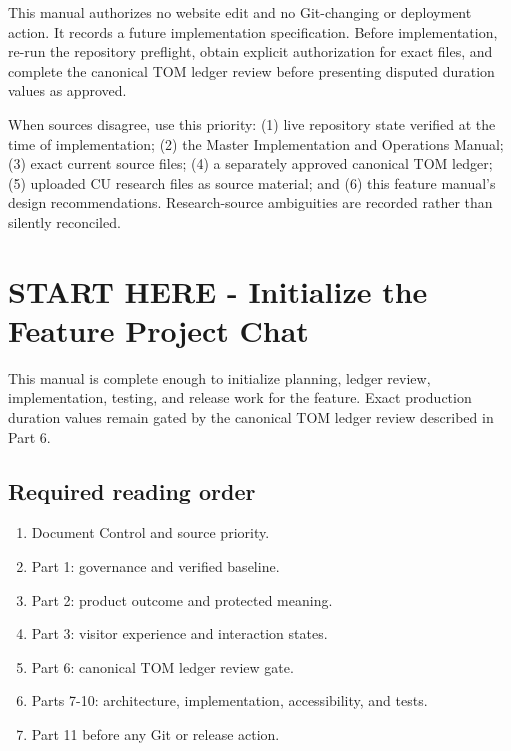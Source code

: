 \documentclass[11pt,letterpaper]{article}
\begin{document}
\begin{safetybox}
This manual authorizes no website edit and no Git-changing or deployment action. It records a future implementation specification. Before implementation, re-run the repository preflight, obtain explicit authorization for exact files, and complete the canonical TOM ledger review before presenting disputed duration values as approved.
\end{safetybox}

\begin{authoritybox}
When sources disagree, use this priority: (1) live repository state verified at the time of implementation; (2) the Master Implementation and Operations Manual; (3) exact current source files; (4) a separately approved canonical TOM ledger; (5) uploaded CU research files as source material; and (6) this feature manual's design recommendations. Research-source ambiguities are recorded rather than silently reconciled.
\end{authoritybox}

\clearpage\tableofcontents\clearpage

\section*{START HERE - Initialize the Feature Project Chat}
\begin{successbox}
This manual is complete enough to initialize planning, ledger review, implementation, testing, and release work for the feature. Exact production duration values remain gated by the canonical TOM ledger review described in Part 6.
\end{successbox}

\subsection*{Required reading order}
\begin{enumerate}
\item Document Control and source priority.
\item Part 1: governance and verified baseline.
\item Part 2: product outcome and protected meaning.
\item Part 3: visitor experience and interaction states.
\item Part 6: canonical TOM ledger review gate.
\item Parts 7-10: architecture, implementation, accessibility, and tests.
\item Part 11 before any Git or release action.
\end{enumerate}
\end{document}
